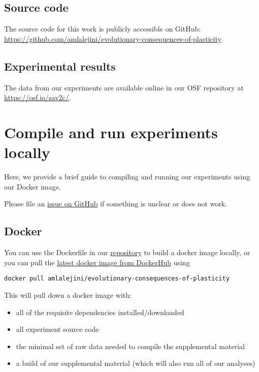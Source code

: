 \documentclass[]{book}
\providecommand{\tightlist}{%
  \setlength{\itemsep}{0pt}\setlength{\parskip}{0pt}}
\begin{document}
\hypertarget{source-code}{%
\section{Source code}\label{source-code}}

The source code for this work is publicly accessible on GitHub: \url{https://github.com/amlalejini/evolutionary-consequences-of-plasticity}

\hypertarget{experimental-results}{%
\section{Experimental results}\label{experimental-results}}

The data from our experiments are available online in our OSF repository \citep{osf_data} at \url{https://osf.io/sav2c/}.

\hypertarget{compile-and-run-experiments-locally}{%
\chapter{Compile and run experiments locally}\label{compile-and-run-experiments-locally}}

Here, we provide a brief guide to compiling and running our experiments using our Docker image.

Please file an \href{https://github.com/amlalejini/evolutionary-consequences-of-plasticity}{issue on GitHub} if something is unclear or does not work.

\hypertarget{docker}{%
\section{Docker}\label{docker}}

You can use the Dockerfile in our \href{https://github.com/amlalejini/evolutionary-consequences-of-plasticity}{repository} to build a docker image locally, or you can pull the \href{https://hub.docker.com/r/amlalejini/evolutionary-consequences-of-plasticity}{latest docker image from DockerHub} using

\begin{verbatim}
docker pull amlalejini/evolutionary-consequences-of-plasticity
\end{verbatim}

This will pull down a docker image with:

\begin{itemize}
\tightlist
\item
  all of the requisite dependencies installed/downloaded
\item
  all experiment source code
\item
  the minimal set of raw data needed to compile the supplemental material
\item
  a build of our supplemental material (which will also run all of our analyses)
\end{itemize}
\end{document}
